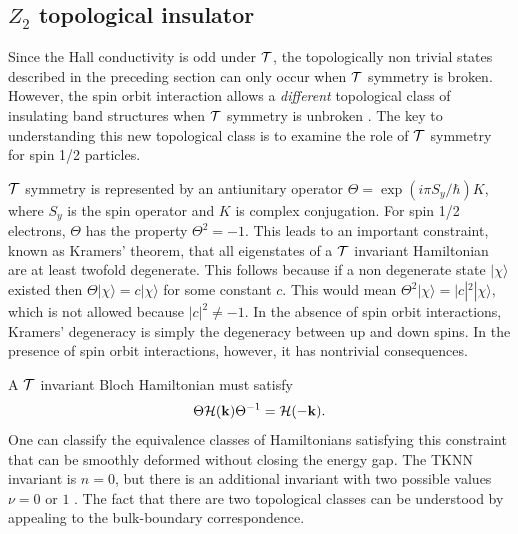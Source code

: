 \documentclass[twocolumn,floatfix,showpacs,rmp,aps]{revtex4}
\begin{document}
	
	
	\subsection{$Z_2$ topological insulator}
	\label{sec:z2topo}
	
	Since the Hall conductivity
	is odd under ${\cal T}$, the topologically non trivial
	states described in the preceding section
	can only occur when ${\cal T}$ symmetry is broken.
	However, the spin orbit interaction allows
	a {\it different} topological class of insulating band structures when ${\cal T}$
	symmetry is unbroken \cite{kanemele05a}.  The key to understanding this new
	topological class is to examine the role of ${\cal T}$ symmetry
	for spin 1/2 particles.
	
	${\cal T}$ symmetry is represented by an antiunitary operator
	$\Theta = \exp(i\pi S_y/\hbar) K$, where $S_y$ is the spin
	operator and $K$ is complex conjugation.
	For spin 1/2 electrons, $\Theta$ has the property $\Theta^2 = -1$.
	This leads to an important constraint, known as Kramers' theorem,
	that all eigenstates of a ${\cal T}$ invariant Hamiltonian
	are at least twofold degenerate.
	This follows because if a non degenerate state $|\chi\rangle$ existed then
	$\Theta |\chi\rangle = c |\chi\rangle$ for some constant $c$.  This would mean $\Theta^2
	|\chi\rangle = |c|^2 |\chi\rangle$, which is not allowed because
	$|c|^2 \ne -1$.  In the absence of spin orbit interactions, Kramers'
	degeneracy is simply the degeneracy between up and down spins.  In
	the presence of spin orbit interactions, however, it has nontrivial
	consequences.
	
	A ${\cal T}$ invariant Bloch Hamiltonian must satisfy
	\begin{equation}
		\Theta {\cal H}({\bf k}) \Theta^{-1} = {\cal H}(-{\bf k}).
		\label{trsym}
	\end{equation}
	One can classify the equivalence classes of
	Hamiltonians satisfying this constraint that can be smoothly deformed
	without closing the energy gap.  The TKNN invariant is $n=0$, but
	there is an additional invariant with
	two possible values $\nu = 0$ or $1$ \cite{kanemele05b}.   The fact that there are two
	topological classes can be understood
	by appealing to the bulk-boundary correspondence.
	
\end{document}

